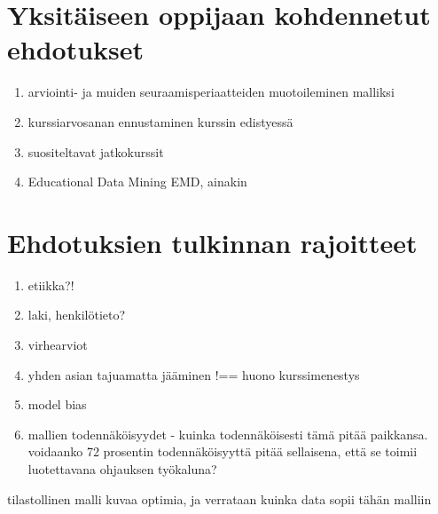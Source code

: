 \color{red}
\section{Yksitäiseen oppijaan kohdennetut ehdotukset}

\begin{enumerate}
    \item arviointi- ja muiden seuraamisperiaatteiden muotoileminen malliksi
    \item kurssiarvosanan ennustaminen kurssin edistyessä
    \item suositeltavat jatkokurssit
    \item Educational Data Mining EMD, ainakin \citep{romeroEducationalDataMining2010}

\end{enumerate}

\section{Ehdotuksien tulkinnan rajoitteet}

\begin{enumerate}
    \item etiikka?! \citep{kailaEthicalConsiderationsLearning2019}
    \item laki, henkilötieto? \citep{hannulaOppijanDigitaalinenJalanjalki2017}
    \item virhearviot
    \item yhden asian tajuamatta jääminen !== huono kurssimenestys
    \item model bias
    \item mallien todennäköisyydet - kuinka todennäköisesti tämä pitää paikkansa. voidaanko 72 prosentin todennäköisyyttä pitää sellaisena, että se toimii luotettavana ohjauksen työkaluna?
\end{enumerate}


tilastollinen malli kuvaa optimia, ja verrataan kuinka data sopii tähän malliin